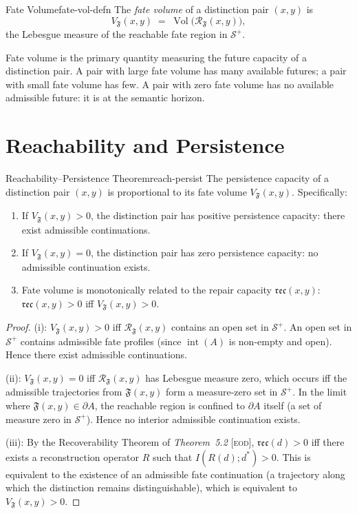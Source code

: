 \documentclass[12pt,twoside,openright]{book}
\newcommand{\reco}{\mathfrak{rec}}        %
\newcommand{\Vol}{\operatorname{Vol}}     %
\newcommand{\fateMap}{\mathfrak{F}}
\newcommand{\fateSpace}{\mathcal{S}}
\newcommand{\EOD}[1]{\textit{#1} [\textsc{eod}]}
\newcommand{\admRegion}{A}
\providecommand{\fatePos}{\fateSpace^{+}}
\providecommand{\admRegion}{A}
\providecommand{\fateReach}[1]{\mathcal{R}_{\fateMap}(#1)}
\providecommand{\fateVol}[1]{V_{\fateMap}(#1)}
\begin{document}
\begin{definition}{Fate Volume}{fate-vol-defn}
The \emph{fate volume} of a distinction pair $(x,y)$ is
\[
  \fateVol{x,y}
  \;=\;
  \Vol\bigl(\fateReach{x,y}\bigr),
\]
the Lebesgue measure of the reachable fate region in $\fatePos$.
\end{definition}

Fate volume is the primary quantity measuring the future
capacity of a distinction pair. A pair with large fate volume
has many available futures; a pair with small fate volume has
few. A pair with zero fate volume has no available admissible
future: it is at the semantic horizon.

\section{Reachability and Persistence}

\begin{theorem}{Reachability--Persistence Theorem}{reach-persist}
The persistence capacity of a distinction pair $(x,y)$ is
proportional to its fate volume $\fateVol{x,y}$. Specifically:
\begin{enumerate}[nosep,label=(\roman*)]
  \item If $\fateVol{x,y}>0$, the distinction pair has positive
    persistence capacity: there exist admissible continuations.
  \item If $\fateVol{x,y}=0$, the distinction pair has zero
    persistence capacity: no admissible continuation exists.
  \item Fate volume is monotonically related to the repair
    capacity $\reco(x,y)$: $\reco(x,y)>0$ iff $\fateVol{x,y}>0$.
\end{enumerate}
\begin{proof}
(i): $\fateVol{x,y}>0$ iff $\fateReach{x,y}$ contains an open
set in $\fatePos$. An open set in $\fatePos$ contains
admissible fate profiles (since $\operatorname{int}(\admRegion)$
is non-empty and open). Hence there exist admissible
continuations.

(ii): $\fateVol{x,y}=0$ iff $\fateReach{x,y}$ has Lebesgue
measure zero, which occurs iff the admissible trajectories from
$\fateMap(x,y)$ form a measure-zero set in $\fatePos$. In the
limit where $\fateMap(x,y)\in\partial\admRegion$, the
reachable region is confined to $\partial\admRegion$ itself
(a set of measure zero in $\fatePos$). Hence no interior
admissible continuation exists.

(iii): By the Recoverability Theorem of \EOD{Theorem~5.2},
$\reco(d)>0$ iff there exists a reconstruction operator $R$
such that $I(R(d);d^*)>0$. This is equivalent to the existence
of an admissible fate continuation (a trajectory along which
the distinction remains distinguishable), which is equivalent
to $\fateVol{x,y}>0$.
\end{proof}
\end{theorem}
\end{document}
